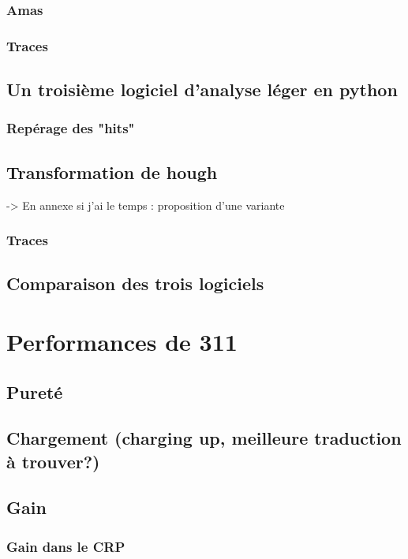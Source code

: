             \subsubsection{Amas}
            \subsubsection{Traces}
        \subsection{Un troisième logiciel d'analyse léger en python}\label{sec::rawdatasoft}
            \subsubsection{Repérage des "hits"}
            \subsection{Transformation de hough}
                -> En annexe si j'ai le temps : proposition d'une variante
            \subsubsection{Traces}
        \subsection{Comparaison des trois logiciels}
        
    \section{Performances de 311}
        \subsection{Pureté}
        \subsection{Chargement (charging up, meilleure traduction à trouver?)}
        \subsection{Gain}
            \subsubsection{Gain dans le CRP}
